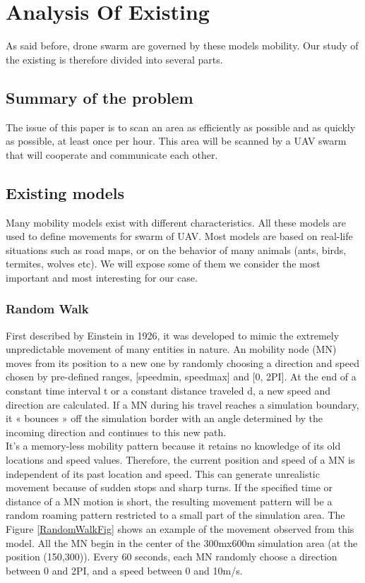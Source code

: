 \chapter{Analysis Of Existing}

As said before, drone swarm are governed by these models mobility. Our study of the existing is therefore divided into several parts.

\section{Summary of the problem}

The issue of this paper is to scan an area as efficiently as possible and as quickly as possible, at least once per hour. This area will be scanned by a UAV swarm that will cooperate and communicate each other.

\section{Existing models}

Many mobility models exist with different characteristics. All these models are used to define movements for swarm of UAV. Most models are based on real-life situations such as road maps, or on the behavior of many animals (ants, birds, termites, wolves etc). We will expose some of them we consider the most important and most interesting for our case.

\newpage
\subsection{Random Walk}

First described by Einstein in 1926, it was developed to mimic the extremely unpredictable movement of many entities in nature. An mobility node (MN) moves from its position to a new one by randomly choosing a direction and speed chosen by pre-defined ranges, [speedmin, speedmax] and [0, 2PI]. At the end of a constant time interval t or a constant distance traveled d, a new speed and direction are calculated. If a MN during his travel reaches a simulation boundary, it « bounces » off the simulation border with an angle determined by the incoming direction and continues to this new path.\\
It's a memory-less mobility pattern because it retains no knowledge of its old locations and speed values. Therefore, the current position and speed of a MN is independent of its past location and speed. This can generate unrealistic movement because of sudden stops and sharp turns. If the specified time or distance of a MN motion is short, the resulting movement pattern will be a random roaming pattern restricted to a small part of the simulation area. The Figure \ref{RandomWalkFig} shows an example of the movement observed from this model. All the MN begin in the center of the 300mx600m simulation area (at the position (150,300)). Every 60 seconds, each MN randomly choose a direction between 0 and 2PI, and a speed between 0 and 10m/s.\\

